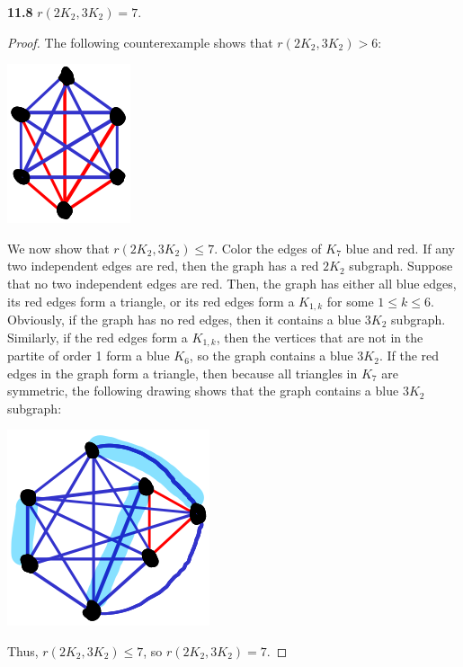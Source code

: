 \documentclass[12pt]{article}
\begin{document}
\newpage\noindent\textbf{11.8} $r(2K_2, 3K_2) = 7$.
\begin{proof}
    The following counterexample shows that $r(2K_2, 3K_2) > 6$:
    \begin{center} \includegraphics[scale=.65]{10.png} \end{center}
    
    We now show that $r(2K_2, 3K_2) \leq 7$.
    Color the edges of $K_7$ blue and red.
    If any two independent edges are red, then the graph has a red $2K_2$ subgraph.
    Suppose that no two independent edges are red.
    Then, the graph has either all blue edges, its red edges form a triangle, or its red edges form a $K_{1,k}$ for some $1 \leq k \leq 6$.
    Obviously, if the graph has no red edges, then it contains a blue $3K_2$ subgraph.
    Similarly, if the red edges form a $K_{1,k}$, then the vertices that are not in the partite of order 1 form a blue $K_6$, so the graph contains a blue $3K_2$.
    If the red edges in the graph form a triangle, then because all triangles in $K_7$ are symmetric, the following drawing shows that the graph contains a blue $3K_2$ subgraph:
    \begin{center} \includegraphics[scale=.5]{11.png} \end{center}
    Thus, $r(2K_2, 3K_2) \leq 7$, so $r(2K_2, 3K_2) = 7$.
\end{proof}
\end{document}
